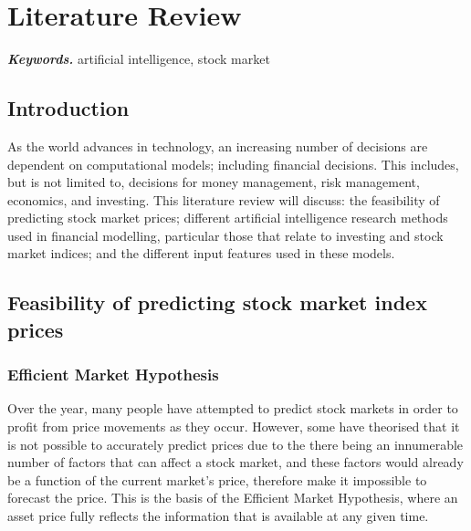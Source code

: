 \providecommand{\keywords}[1]{\textbf{\textit{Keywords.}} #1}

\chapter{Literature Review} \label{chap:literature-review}
\keywords{artificial intelligence, stock market}
\section{Introduction}
As the world advances in technology, an increasing number of decisions are dependent on computational models; including financial decisions. This includes, but is not limited to, decisions for money management, risk management, economics, and investing.
This literature review will discuss: the feasibility of predicting stock market prices; different artificial intelligence research methods used in financial modelling, particular those that relate to investing and stock market indices; and the different input features used in these models.

\section{Feasibility of predicting stock market index prices}
\subsection{Efficient Market Hypothesis}
Over the year,  many people have attempted to predict stock markets in order to profit from price movements as they occur. However, some have theorised that it is not possible to accurately predict prices due to the there being an innumerable number of factors that can affect a stock market, and these factors would already be a function of the current market's price, therefore make it impossible to forecast the price. \parencite[1]{theoryofspeculation} This is the basis of the Efficient Market Hypothesis, where an asset price fully reflects the information that is available at any given time.

